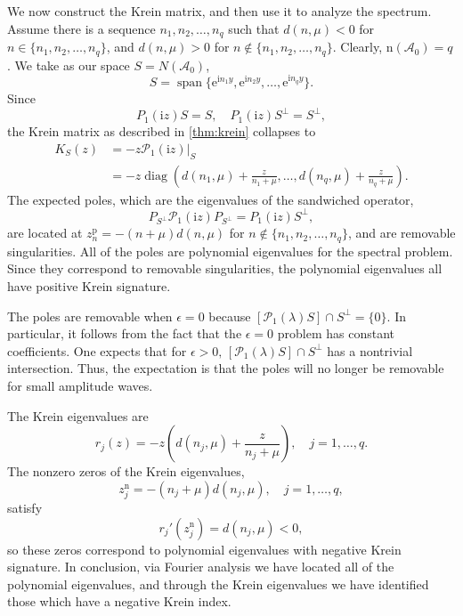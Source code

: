 \documentclass[review,onefignum,onetabnum]{siamart171218}
\def\diag{\mathop\mathrm{diag}\nolimits}
\def\Span{\mathop\mathrm{span}\nolimits}
\newcommand{\rme}{\mathrm{e}}
\newcommand{\rmi}{\mathrm{i}}
\newcommand{\rmn}{\mathrm{n}}
\newcommand{\rmp}{\mathrm{p}}
\newcommand{\calA}{\mathcal{A}}
\newcommand{\calP}{\mathcal{P}}
\newcommand{\vK}{\bm{\mathit{K}}}
\begin{document}
We now construct the Krein matrix, and then use it to analyze the spectrum.  Assume there is a sequence
$n_1,n_2,\dots,n_q$ such that $d(n,\mu)<0$ for $n\in\{n_1,n_2,\dots,n_q\}$,
and $d(n,\mu)>0$ for $n\notin\{n_1,n_2,\dots,n_q\}$. Clearly,
$\rmn(\calA_0)=q$. We take as our space $S=N(\calA_0)$,
\[
S=\Span\{\rme^{\rmi n_1y},\rme^{\rmi n_2 y},\dots,\rme^{\rmi n_q y}\}.
\]
Since
\[
P_1(\rmi z)S=S,\quad P_1(\rmi z)S^\perp=S^\perp,
\]
the Krein matrix as described in \cref{thm:krein} collapses to
\[
\begin{aligned}
\vK_S(z)&=-z\calP_1(\rmi z)|_S\\
&=-z\diag\left(d(n_1,\mu)+\frac{z}{n_1+\mu},\dots,d(n_q,\mu)+\frac{z}{n_q+\mu}\right).
\end{aligned}
\]
The expected poles, which are the eigenvalues of the sandwiched operator,
\[
P_{S^\perp}\calP_1(\rmi z)P_{S^\perp}=P_1(\rmi z)S^\perp,
\]
are located at
$z_n^\rmp=-(n+\mu)d(n,\mu)$ for $n\notin\{n_1,n_2,\dots,n_q\}$, and are
removable singularities. All of the poles are polynomial eigenvalues for the spectral
problem. Since they correspond to removable singularities, the polynomial
eigenvalues all have positive Krein signature. 

\begin{remark}
The poles are removable when $\epsilon=0$ because  $[\calP_1(\lambda)S]\cap S^\perp=\{0\}$. In particular, it follows from the fact that the $\epsilon=0$ problem has constant coefficients.  One expects that for $\epsilon>0,\,[\calP_1(\lambda)S]\cap S^\perp$ has a nontrivial intersection. Thus, the expectation is that the poles will no longer be removable for small amplitude waves.
\end{remark}

The Krein eigenvalues are
\[
r_j(z)=-z\left(d(n_j,\mu)+\frac{z}{n_j+\mu}\right),\quad j=1,\dots,q.
\]
The nonzero zeros of the Krein eigenvalues,
\[
z_j^\rmn=-(n_j+\mu)d(n_j,\mu),\quad j=1,\dots,q,
\]
satisfy
\[
r_j'(z_j^\rmn)=d(n_j,\mu)<0,
\]
so these zeros correspond to polynomial eigenvalues with negative Krein
signature. In conclusion, via Fourier analysis we have located all of the polynomial eigenvalues, and through the Krein eigenvalues we have identified those which have a negative Krein index.
\end{document}

